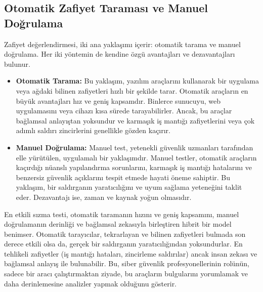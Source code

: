 \subsection{Otomatik Zafiyet Taraması ve Manuel Doğrulama}

Zafiyet değerlendirmesi, iki ana yaklaşımı içerir: otomatik tarama ve manuel doğrulama. Her iki yöntemin de kendine özgü avantajları ve dezavantajları bulunur.

\begin{itemize}
\item \textbf{Otomatik Tarama:} Bu yaklaşım, yazılım araçlarını kullanarak bir uygulama veya ağdaki bilinen zafiyetleri hızlı bir şekilde tarar. Otomatik araçların en büyük avantajları hız ve geniş kapsamdır. Binlerce sunucuyu, web uygulamasını veya cihazı kısa sürede tarayabilirler. Ancak, bu araçlar bağlamsal anlayıştan yoksundur ve karmaşık iş mantığı zafiyetlerini veya çok adımlı saldırı zincirlerini genellikle gözden kaçırır.
\item \textbf{Manuel Doğrulama:} Manuel test, yetenekli güvenlik uzmanları tarafından elle yürütülen, uygulamalı bir yaklaşımdır. Manuel testler, otomatik araçların kaçırdığı nüanslı yapılandırma sorunlarını, karmaşık iş mantığı hatalarını ve benzersiz güvenlik açıklarını tespit etmede hayati öneme sahiptir. Bu yaklaşım, bir saldırganın yaratıcılığını ve uyum sağlama yeteneğini taklit eder. Dezavantajı ise, zaman ve kaynak yoğun olmasıdır.
\end{itemize}

En etkili sızma testi, otomatik taramanın hızını ve geniş kapsamını, manuel doğrulamanın derinliği ve bağlamsal zekasıyla birleştiren hibrit bir model benimser. Otomatik tarayıcılar, tekrarlayan ve bilinen zafiyetleri bulmada son derece etkili olsa da, gerçek bir saldırganın yaratıcılığından yoksundurlar. En tehlikeli zafiyetler (iş mantığı hataları, zincirleme saldırılar) ancak insan zekası ve bağlamsal anlayış ile bulunabilir. Bu, siber güvenlik profesyonellerinin rolünün, sadece bir aracı çalıştırmaktan ziyade, bu araçların bulgularını yorumlamak ve daha derinlemesine analizler yapmak olduğunu gösterir.

